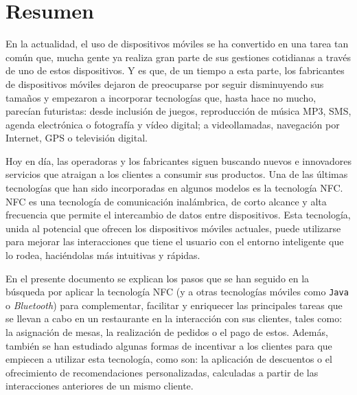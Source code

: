 
\chapter{Resumen}
En la actualidad, el uso de dispositivos móviles se ha convertido en una tarea
tan común que, mucha gente ya realiza gran parte de sus gestiones cotidianas a
través de uno de estos dispositivos. Y es que, de un tiempo a esta parte, los
fabricantes de dispositivos móviles dejaron de preocuparse
por seguir disminuyendo sus tamaños y empezaron a incorporar tecnologías que,
hasta hace no mucho, parecían futuristas: desde inclusión de juegos, 
reproducción de música MP3, \acs{SMS}, agenda electrónica o fotografía y vídeo 
digital; a videollamadas, navegación por Internet, \acs{GPS} o televisión 
digital.

Hoy en día, las operadoras y los fabricantes siguen buscando nuevos e
innovadores servicios que atraigan a los clientes a consumir sus 
productos. Una de las últimas tecnologías que han sido incorporadas en algunos
modelos es la tecnología \acs{NFC}. \acs{NFC} es una
tecnología de comunicación inalámbrica, de corto alcance y alta frecuencia que
permite el intercambio de datos entre dispositivos. Esta tecnología, unida
al potencial que ofrecen los dispositivos móviles actuales, puede utilizarse
para mejorar las interacciones que tiene el usuario con el entorno inteligente
que lo rodea, haciéndolas más intuitivas y rápidas.

En el presente documento se explican los pasos que se han seguido en la
búsqueda por aplicar la tecnología \acs{NFC} (y a otras tecnologías
móviles como \texttt{Java} o \emph{Bluetooth}) para complementar, facilitar y
enriquecer las principales tareas que se llevan a cabo en un restaurante en
la interacción con sus clientes, tales como: la asignación de mesas, la
realización de pedidos o el pago de estos. Además, también se han estudiado
algunas formas de incentivar a los clientes para que empiecen a utilizar esta
tecnología, como son: la aplicación de descuentos o el ofrecimiento de
recomendaciones personalizadas, calculadas a partir de las interacciones
anteriores de un mismo cliente.


